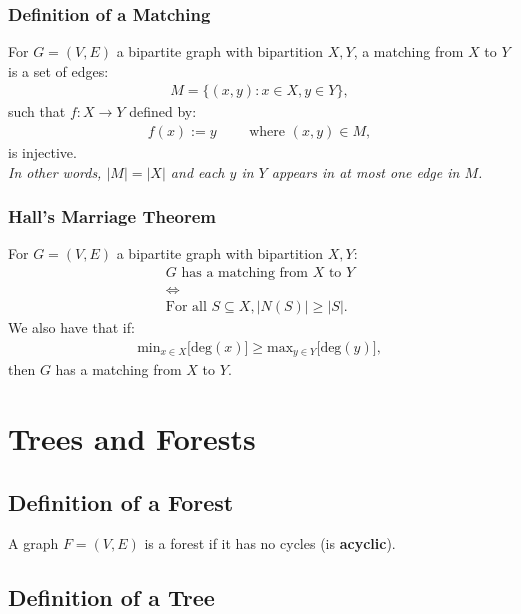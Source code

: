 \documentclass[a4paper, 12pt, twoside]{article}
\begin{document}
\subsubsection{Definition of a Matching}

For $G = (V, E)$ a bipartite graph with bipartition $X, Y$,
a matching from $X$ to $Y$ is a set of edges: \begin{gather*}
  M = \{(x, y) : x \in X, y \in Y\},
\end{gather*} such that $f : X \to Y$ defined by: \begin{gather*}
  f(x) := y \qquad \text{ where } (x, y) \in M,
\end{gather*} is injective.
\\[\baselineskip]
\textit{In other words, $|M| = |X|$ and each $y$ in $Y$ appears 
in at most one edge in $M$.}

\subsubsection{Hall's Marriage Theorem}

For $G = (V, E)$ a bipartite graph with bipartition $X, Y$: \begin{gather*}
  G \text{ has a matching from } X \text{ to } Y \\
  \Longleftrightarrow \\
  \text{For all } S \subseteq X, |N(S)| \geq |S|.
\end{gather*} We also have that if: \begin{gather*}
  \text{min}_{x \in X}\big[\text{deg}(x)\big] \geq
  \text{max}_{y \in Y}\big[\text{deg}(y)\big],
\end{gather*} then $G$ has a matching from $X$ to $Y$.

\vfill

\section{Trees and Forests}

\subsection{Definition of a Forest}

A graph $F = (V, E)$ is a forest if it has no cycles
(is \textbf{acyclic}).

\subsection{Definition of a Tree}
\end{document}

